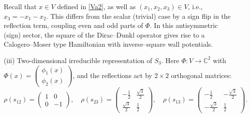 \documentclass[12pt]{article}
\newcommand{\1}{\mathbbm{1}}
\theoremstyle{definition}
\begin{document}
\begin{itemize}
Recall that $x\in V$ defined in \eqref{Va2}, as well as $(x_1,x_2,x_3)\in V$, i.e., $x_3=-x_1-x_2$.
This differs from the scalar (trivial) case by a sign flip in the reflection term,
coupling even and odd parts of $\Phi$. In this antisymmetric (sign) sector, the
square of the Dirac--Dunkl operator gives rise to a Calogero--Moser type Hamiltonian
with inverse--square wall potentials.



\item[(iii)] Two-dimensional irreducible representation of $S_3$.
Here $\Phi:V\to\mathbb{C}^2$ with $\Phi(x)=\begin{pmatrix}\phi_1(x) \\ \phi_2(x)\end{pmatrix}$,
and the reflections act by $2\times 2$ orthogonal matrices:
\[
\rho(s_{12})=\begin{pmatrix}1&0\\0&-1\end{pmatrix},\quad
\rho(s_{23})=\begin{pmatrix}-\tfrac{1}{2}&\tfrac{\sqrt{3}}{2}\\[6pt]\tfrac{\sqrt{3}}{2}&\tfrac{1}{2}\end{pmatrix},\quad
\rho(s_{13})=\begin{pmatrix}-\tfrac{1}{2}&-\tfrac{\sqrt{3}}{2}\\[6pt]-\tfrac{\sqrt{3}}{2}&\tfrac{1}{2}\end{pmatrix}.
\]


\end{itemize}
\end{document}
